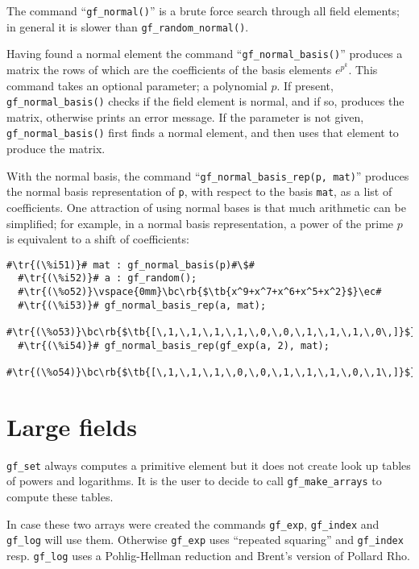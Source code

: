 \documentclass[a4paper,11pt,leqno,fleqn]{artikel3}
\newcommand{\bc}{\begin{center}}
\newcommand{\ec}{\end{center}}
\newcommand{\tr}[1]{\textcolor{red}{#1}}
\newcommand{\tb}[1]{\textcolor{blue}{#1}}
\newcommand{\rb}[1]{\raisebox{2mm}[0mm][1mm]{#1}}
\begin{document}
The command ``\verb!gf_normal()!'' is a brute force search through all
field elements; in general it is slower than \verb!gf_random_normal()!.

Having found a normal element the command ``\verb!gf_normal_basis()!'' produces a
matrix the rows of which are the coefficients of the basis elements
$e^{p^k}$.  This command takes an optional parameter; a polynomial $p$.  If
present, \verb!gf_normal_basis()! checks if the field element is normal, and if
so, produces the matrix, otherwise prints an error message.  If the parameter
is not given, \verb!gf_normal_basis()! first finds a normal element, and then
uses that element to produce the matrix.

With the normal basis, the command ``\verb!gf_normal_basis_rep(p, mat)!'' produces the
normal basis representation of \texttt{p}, with respect to the basis
\texttt{mat}, as a list of coefficients.  One attraction of using normal bases
is that much arithmetic can be simplified; for example, in a normal basis
representation, a power of the prime $p$ is equivalent to a shift of
coefficients:

\vspace*{2mm}
\begin{lstlisting}[escapechar=\#]
  #\tr{(\%i51)}# mat : gf_normal_basis(p)#\$#
  #\tr{(\%i52)}# a : gf_random();
  #\tr{(\%o52)}\vspace{0mm}\bc\rb{$\tb{x^9+x^7+x^6+x^5+x^2}$}\ec#
  #\tr{(\%i53)}# gf_normal_basis_rep(a, mat);
  #\tr{(\%o53)}\bc\rb{$\tb{[\,1,\,1,\,1,\,1,\,0,\,0,\,1,\,1,\,1,\,0\,]}$}\ec#
  #\tr{(\%i54)}# gf_normal_basis_rep(gf_exp(a, 2), mat);
  #\tr{(\%o54)}\bc\rb{$\tb{[\,1,\,1,\,1,\,0,\,0,\,1,\,1,\,1,\,0,\,1\,]}$}\ec#
\end{lstlisting}


\section*{Large fields}

\texttt{gf\_set} always computes a primitive element but it  
does not create look up tables of powers and logarithms. 
It is the user to decide to call \verb!gf_make_arrays! to compute these tables. 

In case these two arrays were created the commands \verb!gf_exp!, 
\verb!gf_index! and \verb!gf_log! will use them. Otherwise \verb!gf_exp! uses 
``repeated squaring'' and \verb!gf_index! resp. \verb!gf_log! uses a 
Pohlig-Hellman reduction and Brent's version of Pollard Rho. 
\end{document}
